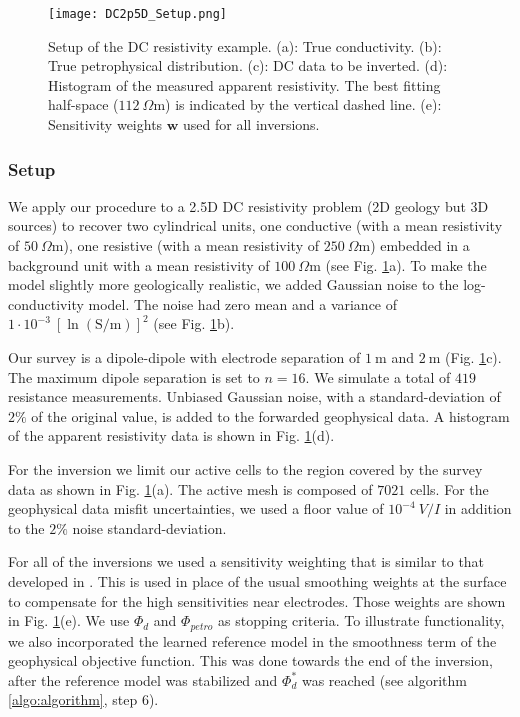 \documentclass[extra]{gji} %
\begin{document}
\begin{figure}
\centering
\texttt{[image: DC2p5D\_Setup.png]}
\caption[]{Setup of the DC resistivity example. (a): True conductivity. (b): True petrophysical distribution. (c): DC data to be inverted. (d): Histogram of the measured apparent resistivity. The best fitting half-space ($112~\Omega \text{m}$) is indicated by the vertical dashed line. (e): Sensitivity weights $\mathbf{w}$ used for all inversions.}
\label{fig:DC2p5D_Setup}
\end{figure}


\subsubsection{Setup}

We apply our procedure to a 2.5D DC resistivity problem (2D geology but 3D sources) to recover two cylindrical units, one conductive (with a mean resistivity of $50~\Omega \text{m}$), one resistive (with a mean resistivity of $250~\Omega \text{m}$) embedded in a background unit with a mean resistivity of $100~\Omega \text{m}$ (see Fig. \ref{fig:DC2p5D_Setup}a). To make the model slightly more geologically realistic, we added Gaussian noise to the log-conductivity model. The noise had zero mean and a variance of $1\cdot10^{-3}~[\ln(\text{S/m})]^2$ (see Fig. \ref{fig:DC2p5D_Setup}b).

Our survey is a dipole-dipole with electrode separation of $1~\text{m}$ and $2~\text{m}$ (Fig. \ref{fig:DC2p5D_Setup}c). The maximum dipole separation is set to $n=16$. We simulate a total of $419$ resistance measurements. Unbiased Gaussian noise, with a standard-deviation of $2\%$ of the original value, is added to the forwarded geophysical data. A histogram of the apparent resistivity data is shown in Fig. \ref{fig:DC2p5D_Setup}(d).

For the inversion we limit our active cells to the region covered by the survey data as shown in Fig. \ref{fig:DC2p5D_Setup}(a). The active mesh is composed of $7021$ cells. For the geophysical data misfit uncertainties, we used a floor value of $10^{-4}~V/I$ in addition to the $2\%$ noise standard-deviation.

For all of the inversions we used a sensitivity weighting that is similar to that developed in \cite{doi:10.1190/1.1820468}. This is used in place of the usual smoothing weights at the surface to compensate for the high sensitivities near electrodes. Those weights are shown in Fig. \ref{fig:DC2p5D_Setup}(e). We use $\Phi_d$ and $\Phi_{petro}$ as stopping criteria. To illustrate functionality, we also incorporated the learned reference model in the smoothness term of the geophysical objective function. This was done towards the end of the inversion, after the reference model was stabilized and $\Phi_d^*$ was reached (see algorithm \ref{algo:algorithm}, step 6).
\end{document}
